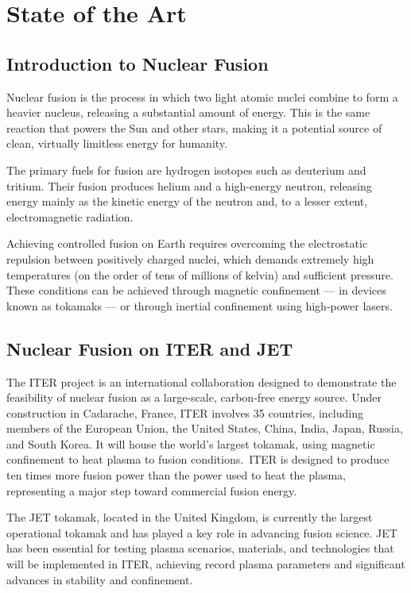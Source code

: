 \chapter{State of the Art} \label{sec:cap2}

\section{Introduction to Nuclear Fusion}

Nuclear fusion is the process in which two light atomic nuclei combine to form a heavier nucleus, releasing a substantial amount of energy. This is the same reaction that powers the Sun and other stars, making it a potential source of clean, virtually limitless energy for humanity.

The primary fuels for fusion are hydrogen isotopes such as deuterium and tritium. Their fusion produces helium and a high-energy neutron, releasing energy mainly as the kinetic energy of the neutron and, to a lesser extent, electromagnetic radiation.

Achieving controlled fusion on Earth requires overcoming the electrostatic repulsion between positively charged nuclei, which demands extremely high temperatures (on the order of tens of millions of kelvin) and sufficient pressure. These conditions can be achieved through magnetic confinement — in devices known as tokamaks — or through inertial confinement using high-power lasers.


\section{Nuclear Fusion on \acs{ITER} and \acs{JET}}

The \ac{ITER} project is an international collaboration designed to demonstrate the feasibility of nuclear fusion as a large-scale, carbon-free energy source. Under construction in Cadarache, France, ITER involves 35 countries, including members of the European Union, the United States, China, India, Japan, Russia, and South Korea. It will house the world's largest tokamak, using magnetic confinement to heat plasma to fusion conditions.\ \ac{ITER} is designed to produce ten times more fusion power than the power used to heat the plasma, representing a major step toward commercial fusion energy.

The \ac{JET} tokamak, located in the United Kingdom, is currently the largest operational tokamak and has played a key role in advancing fusion science. \ac{JET} has been essential for testing plasma scenarios, materials, and technologies that will be implemented in \ac{ITER}, achieving record plasma parameters and significant advances in stability and confinement.

